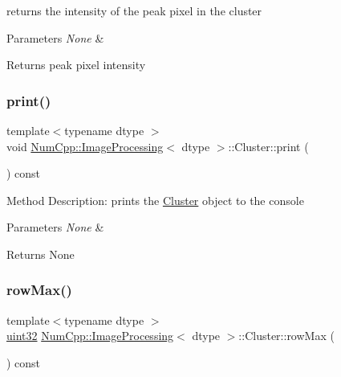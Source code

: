 returns the intensity of the peak pixel in the cluster


\begin{DoxyParams}{Parameters}
{\em None} & \\
\hline
\end{DoxyParams}
\begin{DoxyReturn}{Returns}
peak pixel intensity 
\end{DoxyReturn}
\mbox{\label{class_num_cpp_1_1_image_processing_1_1_cluster_a19a6271d2539f5e19a0d36a3fe7ce224}} 
\subsubsection{\texorpdfstring{print()}{print()}}
{\footnotesize\ttfamily template$<$typename dtype $>$ \\
void \mbox{\hyperlink{class_num_cpp_1_1_image_processing}{Num\+Cpp\+::\+Image\+Processing}}$<$ dtype $>$\+::Cluster\+::print (\begin{DoxyParamCaption}{ }\end{DoxyParamCaption}) const\hspace{0.3cm}{\ttfamily [inline]}}

Method Description\+: prints the \mbox{\hyperlink{class_num_cpp_1_1_image_processing_1_1_cluster}{Cluster}} object to the console


\begin{DoxyParams}{Parameters}
{\em None} & \\
\hline
\end{DoxyParams}
\begin{DoxyReturn}{Returns}
None 
\end{DoxyReturn}
\mbox{\label{class_num_cpp_1_1_image_processing_1_1_cluster_a85fab78cc81b27b60905bfa6515d4ffb}} 
\subsubsection{\texorpdfstring{row\+Max()}{rowMax()}}
{\footnotesize\ttfamily template$<$typename dtype $>$ \\
\mbox{\hyperlink{namespace_num_cpp_a36f388e948380413c63011cab9b7fbd5}{uint32}} \mbox{\hyperlink{class_num_cpp_1_1_image_processing}{Num\+Cpp\+::\+Image\+Processing}}$<$ dtype $>$\+::Cluster\+::row\+Max (\begin{DoxyParamCaption}{ }\end{DoxyParamCaption}) const\hspace{0.3cm}{\ttfamily [inline]}}

